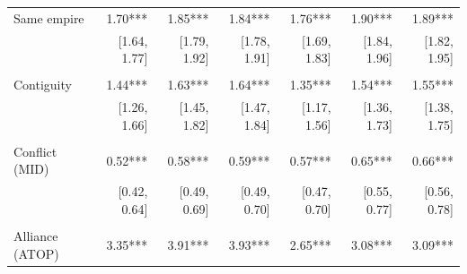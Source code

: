 \begin{table}[!h]
\begin{tabular}{lllllll}
\multicolumn{1}{l}{Same empire} &
  \multicolumn{1}{|r}{1.70***} &
  \multicolumn{1}{r}{1.85***} &
  \multicolumn{1}{r}{1.84***} &
  \multicolumn{1}{r}{1.76***} &
  \multicolumn{1}{r}{1.90***} &
  \multicolumn{1}{r}{1.89***} \\
\multicolumn{1}{l}{} &
  \multicolumn{1}{|r}{[1.64,    1.77]} &
  \multicolumn{1}{r}{[1.79,    1.92]} &
  \multicolumn{1}{r}{[1.78,    1.91]} &
  \multicolumn{1}{r}{[1.69,    1.83]} &
  \multicolumn{1}{r}{[1.84,    1.96]} &
  \multicolumn{1}{r}{[1.82,    1.95]} \\
\multicolumn{1}{l}{} &
  \multicolumn{1}{|r}{} &
  \multicolumn{1}{r}{} &
  \multicolumn{1}{r}{} &
  \multicolumn{1}{r}{} &
  \multicolumn{1}{r}{} &
  \multicolumn{1}{r}{} \\
\multicolumn{1}{l}{Contiguity} &
  \multicolumn{1}{|r}{1.44***} &
  \multicolumn{1}{r}{1.63***} &
  \multicolumn{1}{r}{1.64***} &
  \multicolumn{1}{r}{1.35***} &
  \multicolumn{1}{r}{1.54***} &
  \multicolumn{1}{r}{1.55***} \\
\multicolumn{1}{l}{} &
  \multicolumn{1}{|r}{[1.26,    1.66]} &
  \multicolumn{1}{r}{[1.45,    1.82]} &
  \multicolumn{1}{r}{[1.47,    1.84]} &
  \multicolumn{1}{r}{[1.17,    1.56]} &
  \multicolumn{1}{r}{[1.36,    1.73]} &
  \multicolumn{1}{r}{[1.38,    1.75]} \\
\multicolumn{1}{l}{} &
  \multicolumn{1}{|r}{} &
  \multicolumn{1}{r}{} &
  \multicolumn{1}{r}{} &
  \multicolumn{1}{r}{} &
  \multicolumn{1}{r}{} &
  \multicolumn{1}{r}{} \\
\multicolumn{1}{l}{Conflict (MID)} &
  \multicolumn{1}{|r}{0.52***} &
  \multicolumn{1}{r}{0.58***} &
  \multicolumn{1}{r}{0.59***} &
  \multicolumn{1}{r}{0.57***} &
  \multicolumn{1}{r}{0.65***} &
  \multicolumn{1}{r}{0.66***} \\
\multicolumn{1}{l}{} &
  \multicolumn{1}{|r}{[0.42,    0.64]} &
  \multicolumn{1}{r}{[0.49,    0.69]} &
  \multicolumn{1}{r}{[0.49,    0.70]} &
  \multicolumn{1}{r}{[0.47,    0.70]} &
  \multicolumn{1}{r}{[0.55,    0.77]} &
  \multicolumn{1}{r}{[0.56,    0.78]} \\
\multicolumn{1}{l}{} &
  \multicolumn{1}{|r}{} &
  \multicolumn{1}{r}{} &
  \multicolumn{1}{r}{} &
  \multicolumn{1}{r}{} &
  \multicolumn{1}{r}{} &
  \multicolumn{1}{r}{} \\
\multicolumn{1}{l}{Alliance (ATOP)} &
  \multicolumn{1}{|r}{3.35***} &
  \multicolumn{1}{r}{3.91***} &
  \multicolumn{1}{r}{3.93***} &
  \multicolumn{1}{r}{2.65***} &
  \multicolumn{1}{r}{3.08***} &
  \multicolumn{1}{r}{3.09***} \\

\end{tabular}
\end{table}
